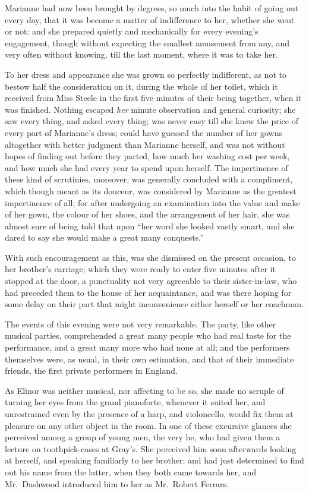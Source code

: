 Marianne had now been brought by degrees, so much
into the habit of going out every day, that it was become
a matter of indifference to her, whether she went or not:
and she prepared quietly and mechanically for every
evening's engagement, though without expecting the smallest
amusement from any, and very often without knowing,
till the last moment, where it was to take her.

To her dress and appearance she was grown so perfectly
indifferent, as not to bestow half the consideration on it,
during the whole of her toilet, which it received from
Miss Steele in the first five minutes of their being
together, when it was finished.  Nothing escaped \emph{her} minute
observation and general curiosity; she saw every thing,
and asked every thing; was never easy till she knew the price
of every part of Marianne's dress; could have guessed the
number of her gowns altogether with better judgment than
Marianne herself, and was not without hopes of finding out
before they parted, how much her washing cost per week,
and how much she had every year to spend upon herself.
The impertinence of these kind of scrutinies, moreover,
was generally concluded with a compliment, which
though meant as its douceur, was considered by Marianne
as the greatest impertinence of all; for after undergoing
an examination into the value and make of her gown,
the colour of her shoes, and the arrangement of her hair,
she was almost sure of being told that upon ``her word
she looked vastly smart, and she dared to say she would
make a great many conquests.''

With such encouragement as this, was she dismissed
on the present occasion, to her brother's carriage;
which they were ready to enter five minutes after it
stopped at the door, a punctuality not very agreeable
to their sister-in-law, who had preceded them to the house
of her acquaintance, and was there hoping for some delay
on their part that might inconvenience either herself
or her coachman.

The events of this evening were not very remarkable.
The party, like other musical parties, comprehended a
great many people who had real taste for the performance,
and a great many more who had none at all; and the performers
themselves were, as usual, in their own estimation,
and that of their immediate friends, the first private
performers in England.

As Elinor was neither musical, nor affecting to be so,
she made no scruple of turning her eyes from the grand
pianoforte, whenever it suited her, and unrestrained even
by the presence of a harp, and violoncello, would fix
them at pleasure on any other object in the room.  In one
of these excursive glances she perceived among a group
of young men, the very he, who had given them a lecture
on toothpick-cases at Gray's.  She perceived him soon
afterwards looking at herself, and speaking familiarly
to her brother; and had just determined to find out his
name from the latter, when they both came towards her,
and Mr.\ Dashwood introduced him to her as Mr.\ Robert Ferrars.

